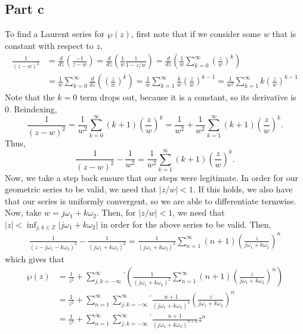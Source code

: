 \documentclass{article}
\begin{document}
\subsection{Part c}
To find a Laurent series for $\wp(z)$, first note that if we consider some $w$ that is constant with respect to $z$, 
\begin{align*}
\frac{1}{(z-w)^2}&=\frac{d}{dz}\left(\frac{-1}{z-w}\right)=\frac{d}{dz}\left(\frac{1}{w}\frac{1}{1-z/w}\right)=\frac{d}{dz}\left(\frac{1}{w}\sum_{k=0}^\infty\left(\frac{z}{w}\right)^k\right)\\&=
\frac{1}{w}\sum_{k=0}^\infty\frac{d}{dz}\left(\left(\frac{z}{w}\right)^k\right)=\frac{1}{w}\sum_{k=1}^\infty\frac{k}{w}\left(\frac{z}{w}\right)^{k-1}=\frac{1}{w^2}\sum_{k=1}^\infty k\left(\frac{z}{w}\right)^{k-1}
\end{align*}
Note that the $k=0$ term drops out, because it is a constant, so its derivative is 0. Reindexing, 
\[
\frac{1}{(z-w)^2}=\frac{1}{w^2}\sum_{k=0}^\infty (k+1)\left(\frac{z}{w}\right)^k=\frac{1}{w^2}+\frac{1}{w^2}\sum_{k=1}^\infty (k+1)\left(\frac{z}{w}\right)^k.
\]
Thus, 
\[\frac{1}{(z-w)^2}-\frac{1}{w^2}=\frac{1}{w^2}\sum_{k=1}^\infty (k+1)\left(\frac{z}{w}\right)^k.
\]
Now, we take a step back ensure that our steps were legitimate. In order for our geometric series to be valid, we need that $|z/w|<1$. If this holds, we also have that our series is uniformly convergent, so we are able to differentiate termwise. \\
Now, take $w=j\omega_1+k\omega_2$. Then, for $|z/w|<1$, we need that $|z|<\inf_{j,k\in\mathbb{Z}}|j\omega_1+k\omega_2|$ in order for the above series to be valid. Then, 
\begin{align*}
\frac{1}{(z-j\omega_1-k\omega_2)^2}-\frac{1}{(j\omega_1+k\omega_2)^2}=\frac{1}{(j\omega_1+k\omega_2)^2}\sum_{n=1}^\infty (n+1)\left(\frac{z}{j\omega_1+k\omega_2}\right)^n
\end{align*}
which gives that 
\begin{align*}
\wp(z)&=\frac{1}{z^2}+\sum_{j,k=-\infty}^{\infty}{}^{'}\left(\frac{1}{(j\omega_1+k\omega_2)^2}\sum_{n=1}^\infty (n+1)\left(\frac{z}{j\omega_1+k\omega_2}\right)^n\right)\\&=
\frac{1}{z^2}+\sum_{n=1}^\infty \sum_{j,k=-\infty}^{\infty}{}^{'}\frac{n+1}{(j\omega_1+k\omega_2)^2}\left(\frac{z}{j\omega_1+k\omega_2}\right)^n\\&=
\frac{1}{z^2}+\sum_{n=1}^\infty \sum_{j,k=-\infty}^{\infty}{}^{'}\frac{n+1}{(j\omega_1+k\omega_2)^{n+2}}z^n
\end{align*}
\end{document}
